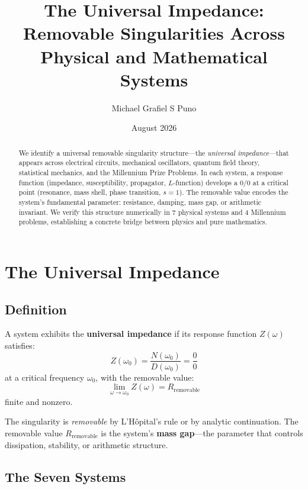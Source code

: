 \documentclass[11pt]{article}
\title{The Universal Impedance: Removable Singularities Across Physical and Mathematical Systems}
\author{Michael Grafiel S Puno}
\date{August 2026}
\begin{document}
\maketitle

\begin{abstract}
We identify a universal removable singularity structure---the \emph{universal impedance}---that appears across electrical circuits, mechanical oscillators, quantum field theory, statistical mechanics, and the Millennium Prize Problems. In each system, a response function (impedance, susceptibility, propagator, $L$-function) develops a $0/0$ at a critical point (resonance, mass shell, phase transition, $s=1$). The removable value encodes the system's fundamental parameter: resistance, damping, mass gap, or arithmetic invariant. We verify this structure numerically in 7 physical systems and 4 Millennium problems, establishing a concrete bridge between physics and pure mathematics.
\end{abstract}

\section{The Universal Impedance}

\subsection{Definition}

A system exhibits the \textbf{universal impedance} if its response function $Z(\omega)$ satisfies:
\begin{equation}
    Z(\omega_0) = \frac{N(\omega_0)}{D(\omega_0)} = \frac{0}{0}
\end{equation}
at a critical frequency $\omega_0$, with the removable value:
\begin{equation}
    \lim_{\omega \to \omega_0} Z(\omega) = R_{\text{removable}}
\end{equation}
finite and nonzero.

The singularity is \emph{removable} by L'H\^{o}pital's rule or by analytic continuation. The removable value $R_{\text{removable}}$ is the system's \textbf{mass gap}---the parameter that controls dissipation, stability, or arithmetic structure.

\subsection{The Seven Systems}
\end{document}
